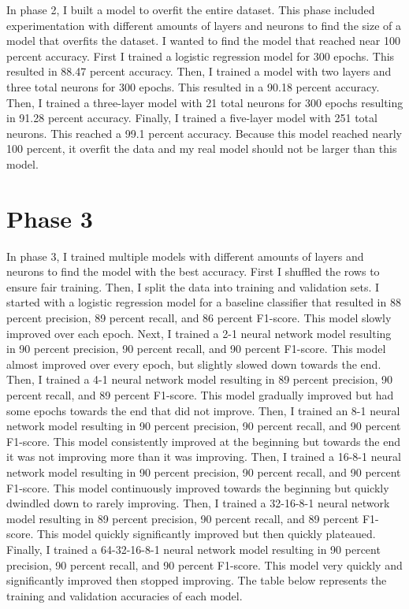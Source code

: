 \documentclass{article}
\begin{document}
In phase 2, I built a model to overfit the entire dataset. This phase included experimentation with different amounts of layers and neurons to find the size of a model that overfits the dataset. I wanted to find the model that reached near 100 percent accuracy. First I trained a logistic regression model for 300 epochs. This resulted in 88.47 percent accuracy. Then, I trained a model with two layers and three total neurons for 300 epochs. This resulted in a 90.18 percent accuracy. Then, I trained a three-layer model with 21 total neurons for 300 epochs resulting in 91.28 percent accuracy. Finally, I trained a five-layer model with 251 total neurons. This reached a 99.1 percent accuracy. Because this model reached nearly 100 percent, it overfit the data and my real model should not be larger than this model. 

\section{Phase 3}

In phase 3, I trained multiple models with different amounts of layers and neurons to find the model with the best accuracy. First I shuffled the rows to ensure fair training. Then, I split the data into training and validation sets. I started with a logistic regression model for a baseline classifier that resulted in 88 percent precision, 89 percent recall, and 86 percent F1-score. This model slowly improved over each epoch. Next, I trained a 2-1 neural network model resulting in 90 percent precision, 90 percent recall, and 90 percent F1-score. This model almost improved over every epoch, but slightly slowed down towards the end. Then, I trained a 4-1 neural network model resulting in 89 percent precision, 90 percent recall, and 89 percent F1-score. This model gradually improved but had some epochs towards the end that did not improve. Then, I trained an 8-1 neural network model resulting in 90 percent precision, 90 percent recall, and 90 percent F1-score. This model consistently improved at the beginning but towards the end it was not improving more than it was improving. Then, I trained a 16-8-1 neural network model resulting in 90 percent precision, 90 percent recall, and 90 percent F1-score. This model continuously improved towards the beginning but quickly dwindled down to rarely improving. Then, I trained a 32-16-8-1 neural network model resulting in 89 percent precision, 90 percent recall, and 89 percent F1-score. This model quickly significantly improved but then quickly plateaued. Finally, I trained a 64-32-16-8-1 neural network model resulting in 90 percent precision, 90 percent recall, and 90 percent F1-score. This model very quickly and significantly improved then stopped improving. The table below represents the training and validation accuracies of each model. 
\end{document}
